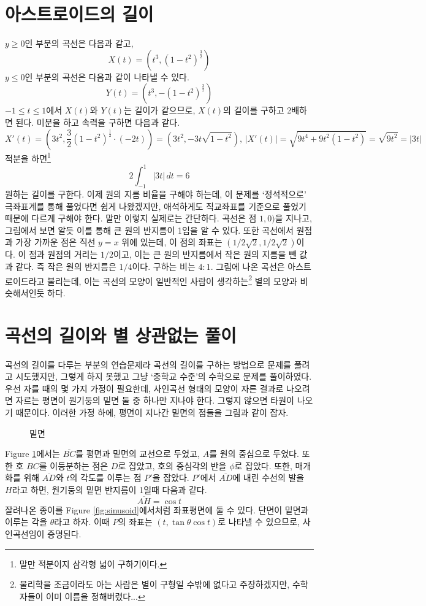 \documentclass{scrartcl}
\newcommand{\Seg}[1]{\overline{#1}}
\begin{document}
\section{아스트로이드의 길이}
\(y\geq0\)인 부분의 곡선은 다음과 같고,
\[X(t)=(t^3, (1 - t^2)^\frac{3}{2})\]
\(y\leq0\)인 부분의 곡선은 다음과 같이 나타낼 수 있다.
\[Y(t)=(t^3, -(1 - t^2)^\frac{3}{2})\]
\(-1\leq t\leq 1\)에서 \(X(t)\)와 \(Y(t)\)는 길이가 같으므로, \(X(t)\)의 길이를 구하고 2배하면 된다. 미분을 하고 속력을 구하면 다음과 같다.
\[X'(t) = \left(3t^2, \frac{3}{2}(1-t^2)^\frac{1}{2}\cdot(-2t)\right)=(3t^2, -3t\sqrt{1 - t^2}),\,|X'(t)|=\sqrt{9t^4+9t^2(1-t^2)}=\sqrt{9t^2}=|3t|\]
적분을 하면\footnote{말만 적분이지 삼각형 넓이 구하기이다.}
\[2\int^1_{-1} |3t|\,dt=6\]
원하는 길이를 구한다. 이제 원의 지름 비율을 구해야 하는데, 이 문제를 `정석적으로' 극좌표계를 통해 풀었다면 쉽게 나왔겠지만, 애석하게도 직교좌표를 기준으로 풀었기 때문에 다르게 구해야 한다. 말만 이렇지 실제로는 간단하다. 곡선은 점 \(1, 0)\)을 지나고, 그림에서 보면 알듯 이를 통해 큰 원의 반지름이 1임을 알 수 있다. 또한 곡선에서 원점과 가장 가까운 점은 직선 \(y=x\) 위에 있는데, 이 점의 좌표는 \(\left(1/2\sqrt{2}, 1/2\sqrt{2}\right)\)이다. 이 점과 원점의 거리는 \(1/2\)이고, 이는 큰 원의 반지름에서 작은 원의 지름을 뺀 값과 같다. 즉 작은 원의 반지름은 \(1/4\)이다. 구하는 비는 \(4:1\). 그림에 나온 곡선은 아스트로이드라고 불리는데, 이는 곡선의 모양이 일반적인 사람이 생각하는\footnote{물리학을 조금이라도 아는 사람은 별이 구형일 수밖에 없다고 주장하겠지만, 수학자들이 이미 이름을 정해버렸다...} 별의 모양과 비슷해서인듯 하다.

\section{곡선의 길이와 별 상관없는 풀이}
곡선의 길이를 다루는 부분의 연습문제라 곡선의 길이를 구하는 방법으로 문제를 풀려고 시도했지만, 그렇게 하지 못했고 그냥 `중학교 수준'의 수학으로 문제를 풀이하였다. 우선 자를 때의 몇 가지 가정이 필요한데, 사인곡선 형태의 모양이 자른 결과로 나오려면 자르는 평면이 원기둥의 밑면 둘 중 하나만 지나야 한다. 그렇지 않으면 타원이 나오기 때문이다. 이러한 가정 하에, 평면이 지나간 밑면의 점들을 그림과 같이 잡자.

\begin{figure}[H]
\centering

\caption{밑면}
\label{fig:cylinder-circularplane}
\end{figure}
Figure \ref{fig:cylinder-circularplane}에서는 \(\Seg{BC}\)를 평면과 밑면의 교선으로 두었고, \(A\)를 원의 중심으로 두었다. 또한 호 \(BC\)를 이등분하는 점은 \(D\)로 잡았고, 호의 중심각의 반을 \(\phi\)로 잡았다. 또한, 매개화를 위해 \(\Seg{AD}\)와 \(t\)의 각도를 이루는 점 \(P'\)을 잡았다. \(P'\)에서 \(\Seg{AD}\)에 내린 수선의 발을 \(H\)라고 하면, 원기둥의 밑면 반지름이 1일때 다음과 같다.
\[\Seg{AH}=\cos t\]
잘려나온 종이를 Figure \ref{fig:sinusoid}에서처럼 좌표평면에 둘 수 있다. 단면이 밑면과 이루는 각을 \(\theta\)라고 하자. 이때 \(P\)의 좌표는 \((t, \tan\theta \cos t)\)로 나타낼 수 있으므로, 사인곡선임이 증명된다.
\end{document}
